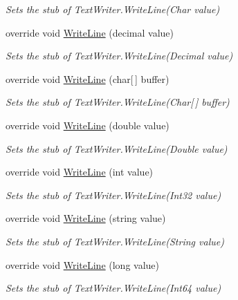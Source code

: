\begin{DoxyCompactItemize}
\begin{DoxyCompactList}\small\item\em Sets the stub of Text\-Writer.\-Write\-Line(\-Char value)\end{DoxyCompactList}\item 
override void \hyperlink{class_system_1_1_i_o_1_1_fakes_1_1_stub_stream_writer_a221ddb0e9f4419ff731132cbbdfa841c}{Write\-Line} (decimal value)
\begin{DoxyCompactList}\small\item\em Sets the stub of Text\-Writer.\-Write\-Line(\-Decimal value)\end{DoxyCompactList}\item 
override void \hyperlink{class_system_1_1_i_o_1_1_fakes_1_1_stub_stream_writer_ac21469c0d548246e7f9f0411bc05a414}{Write\-Line} (char\mbox{[}$\,$\mbox{]} buffer)
\begin{DoxyCompactList}\small\item\em Sets the stub of Text\-Writer.\-Write\-Line(\-Char\mbox{[}$\,$\mbox{]} buffer)\end{DoxyCompactList}\item 
override void \hyperlink{class_system_1_1_i_o_1_1_fakes_1_1_stub_stream_writer_a4ccbb3b35f9d9ad5667c7e0064f69716}{Write\-Line} (double value)
\begin{DoxyCompactList}\small\item\em Sets the stub of Text\-Writer.\-Write\-Line(\-Double value)\end{DoxyCompactList}\item 
override void \hyperlink{class_system_1_1_i_o_1_1_fakes_1_1_stub_stream_writer_a31daea6b9af0c740fa143c68bd6961c1}{Write\-Line} (int value)
\begin{DoxyCompactList}\small\item\em Sets the stub of Text\-Writer.\-Write\-Line(\-Int32 value)\end{DoxyCompactList}\item 
override void \hyperlink{class_system_1_1_i_o_1_1_fakes_1_1_stub_stream_writer_a7152843ebec8ee873ef84322c218ab0b}{Write\-Line} (string value)
\begin{DoxyCompactList}\small\item\em Sets the stub of Text\-Writer.\-Write\-Line(\-String value)\end{DoxyCompactList}\item 
override void \hyperlink{class_system_1_1_i_o_1_1_fakes_1_1_stub_stream_writer_ae081922dc09e5aae6db80aec1ebaf784}{Write\-Line} (long value)
\begin{DoxyCompactList}\small\item\em Sets the stub of Text\-Writer.\-Write\-Line(\-Int64 value)\end{DoxyCompactList}\item 

\end{DoxyCompactItemize}
